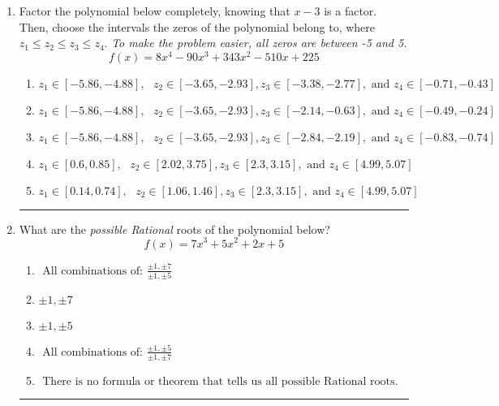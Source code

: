 \documentclass[14pt]{extbook}
\newcommand{\litem}[1]{\item#1\hspace*{-1cm}\rule{\textwidth}{0.4pt}}
\begin{document}
\begin{enumerate}
{\begin{enumerate}[label=\Alph*.]
\end{enumerate} }
\litem{
Factor the polynomial below completely, knowing that $x -3$ is a factor. Then, choose the intervals the zeros of the polynomial belong to, where $z_1 \leq z_2 \leq z_3 \leq z_4$. \textit{To make the problem easier, all zeros are between -5 and 5.}\[ f(x) = 8x^{4} -90 x^{3} +343 x^{2} -510 x + 225 \]\begin{enumerate}[label=\Alph*.]
\item \( z_1 \in [-5.86, -4.88], \text{   }  z_2 \in [-3.65, -2.93], z_3 \in [-3.38, -2.77], \text{   and   } z_4 \in [-0.71, -0.43] \)
\item \( z_1 \in [-5.86, -4.88], \text{   }  z_2 \in [-3.65, -2.93], z_3 \in [-2.14, -0.63], \text{   and   } z_4 \in [-0.49, -0.24] \)
\item \( z_1 \in [-5.86, -4.88], \text{   }  z_2 \in [-3.65, -2.93], z_3 \in [-2.84, -2.19], \text{   and   } z_4 \in [-0.83, -0.74] \)
\item \( z_1 \in [0.6, 0.85], \text{   }  z_2 \in [2.02, 3.75], z_3 \in [2.3, 3.15], \text{   and   } z_4 \in [4.99, 5.07] \)
\item \( z_1 \in [0.14, 0.74], \text{   }  z_2 \in [1.06, 1.46], z_3 \in [2.3, 3.15], \text{   and   } z_4 \in [4.99, 5.07] \)

\end{enumerate} }
\litem{
What are the \textit{possible Rational} roots of the polynomial below?\[ f(x) = 7x^{3} +5 x^{2} +2 x + 5 \]\begin{enumerate}[label=\Alph*.]
\item \( \text{ All combinations of: }\frac{\pm 1,\pm 7}{\pm 1,\pm 5} \)
\item \( \pm 1,\pm 7 \)
\item \( \pm 1,\pm 5 \)
\item \( \text{ All combinations of: }\frac{\pm 1,\pm 5}{\pm 1,\pm 7} \)
\item \( \text{ There is no formula or theorem that tells us all possible Rational roots.} \)

\end{enumerate} }
\end{enumerate}
\end{document}
